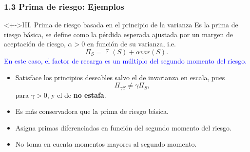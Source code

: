 \documentclass[cjk,t,compress]{beamer}
\newcommand{\field}[1]{\mathbb{#1}}
\newcommand{\expec}{\operatorname{\field{E}}}
\begin{document}
\begin{frame}[fragile]
	\frametitle{1.3 Prima de riesgo: Ejemplos}
	\scriptsize  	
		
		\vspace{0.2cm}
		\begin{block}<+->{III. Prima de riesgo basada en el principio de la varianza}
		\vspace{0.1cm}
		Es la prima de riesgo b\'asica, se define como la p\'erdida esperada ajustada por un margen de aceptaci\'on de riesgo, $\alpha>0$ en funci\'on de su varianza, i.e.
		\begin{equation}
			\Pi_S = \expec(S)+\alpha var(S).
		\end{equation}
		\textcolor{blue}{En este caso, el factor de recarga es un m\'ultiplo del segundo momento del riesgo.}
		
		\begin{itemize}
		  \item Satisface los principios deseables salvo el de invarianza en escala, pues
		  $$\Pi_{\gamma S} \neq \gamma \Pi_{S},$$
		  para $\gamma>0$, y el de {\bf no estafa}.
		  \item Es m\'as conservadora que la prima de riesgo b\'asica.
		  \item Asigna primas diferenciadas en funci\'on del segundo momento del riesgo. 
		  \item No toma en cuenta momentos mayores al segundo momento.
		\end{itemize}
		\end{block}  		

\end{frame}
\end{document}

